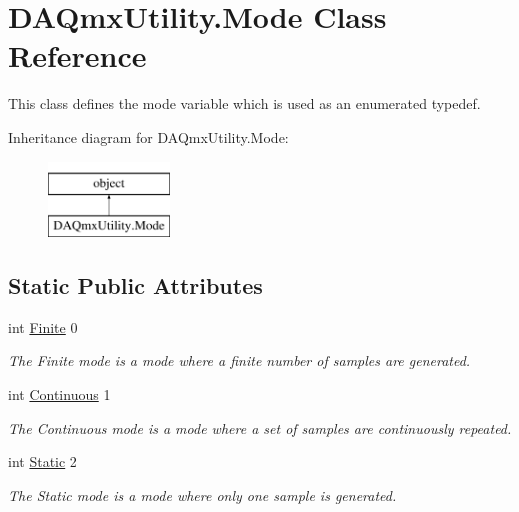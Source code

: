 \hypertarget{class_d_a_qmx_utility_1_1_mode}{\section{D\-A\-Qmx\-Utility.\-Mode Class Reference}
\label{class_d_a_qmx_utility_1_1_mode}
}


This class defines the mode variable which is used as an enumerated typedef.  


Inheritance diagram for D\-A\-Qmx\-Utility.\-Mode\-:\begin{figure}[H]
\begin{center}
\leavevmode
\includegraphics[height=2.000000cm]{class_d_a_qmx_utility_1_1_mode}
\end{center}
\end{figure}
\subsection*{Static Public Attributes}
\begin{DoxyCompactItemize}
\item 
int \hyperlink{class_d_a_qmx_utility_1_1_mode_aedf31db1abedc987384fa876f205b6e3}{Finite} 0
\begin{DoxyCompactList}\small\item\em The Finite mode is a mode where a finite number of samples are generated. \end{DoxyCompactList}\item 
int \hyperlink{class_d_a_qmx_utility_1_1_mode_a9e5a660549cbb0b432aec68a78e95ecd}{Continuous} 1
\begin{DoxyCompactList}\small\item\em The Continuous mode is a mode where a set of samples are continuously repeated. \end{DoxyCompactList}\item 
int \hyperlink{class_d_a_qmx_utility_1_1_mode_aeb3dddf49d2987e35fe408bc53b2e0ec}{Static} 2
\begin{DoxyCompactList}\small\item\em The Static mode is a mode where only one sample is generated. \end{DoxyCompactList}\end{DoxyCompactItemize}


